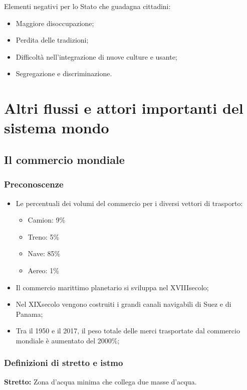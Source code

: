 \documentclass{article}
\begin{document}
Elementi negativi per lo Stato che guadagna cittadini:
\begin{itemize}
    \item Maggiore disoccupazione;
    \item Perdita delle tradizioni;
    \item Difficoltà nell'integrazione di nuove culture e usante;
    \item Segregazione e discriminazione.
\end{itemize}
\pagebreak

\section{Altri flussi e attori importanti del sistema mondo}
\subsection{Il commercio mondiale}
\subsubsection{Preconoscenze}
\begin{itemize}
    \item Le percentuali dei volumi del commercio per i diversi vettori di trasporto:
        \begin{itemize}
            \item Camion: 9\%
            \item Treno: 5\%
            \item Nave: 85\%
            \item Aereo: 1\%
        \end{itemize}
    \item Il commercio marittimo planetario si sviluppa nel XVIII\textdegree secolo;
    \item Nel XIX\textdegree secolo vengono costruiti i grandi canali navigabili di Suez e di
        Panama;
    \item Tra il 1950 e il 2017, il peso totale delle merci trasportate dal commercio mondiale
        è aumentato del 2000\%;
\end{itemize} \phantom{}

\subsubsection{Definizioni di stretto e istmo}
\textbf{Stretto:} Zona d'acqua minima che collega due masse d'acqua.
%
%
%
%
\end{document}
